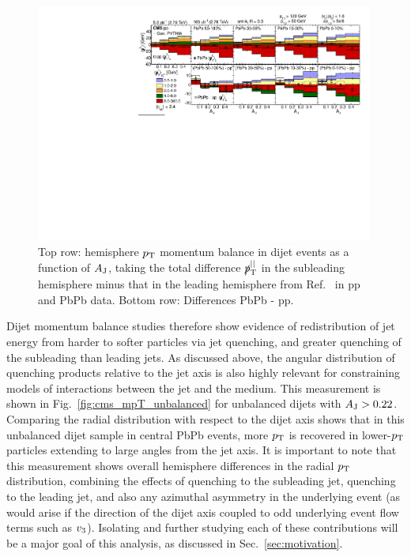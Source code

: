 \begin{figure}[hbtp]
\begin{center}
\includegraphics[width=0.99\textwidth]{figures/Theory/CMS_mpT.pdf}
\caption[Hemisphere momentum balance in dijet events as a function of $A_{\rm J}$]{Top row: hemisphere $p_{\rm T}$ momentum balance in dijet events as a function of $A_{\rm J}$, taking the total difference $\slashed{p}_{\rm T}^{\rm ||}$ in the subleading hemisphere minus that in the leading hemisphere from Ref.~\cite{HIN_2014_010} in pp and PbPb data.  Bottom row:  Differences PbPb - pp.}
\label{fig:cms_mpT}
\end{center}
\end{figure}

Dijet momentum balance studies therefore show evidence of redistribution of jet energy from harder to softer particles via jet quenching, and greater quenching of the subleading than leading jets.  As discussed above, the angular distribution of quenching products relative to the jet axis is also highly relevant for constraining models of interactions between the jet and the medium.  This measurement is shown in Fig.~\ref{fig:cms_mpT_unbalanced} for unbalanced dijets with $A_{\rm J} > 0.22$.  Comparing the radial distribution with respect to the dijet axis shows that in this unbalanced dijet sample in central PbPb events, more $p_{\rm T}$ is recovered in lower-$p_{\rm T}$ particles extending to large angles from the jet axis.  It is important to note that this measurement shows overall hemisphere differences in the radial $p_{\rm T}$ distribution, combining the effects of quenching to the subleading jet, quenching to the leading jet, and also any azimuthal asymmetry in the underlying event (as would arise if the direction of the dijet axis coupled to odd underlying event flow terms such as $v_{\rm 3}$).  Isolating and further studying each of these contributions will be a major goal of this analysis, as discussed in Sec.~\ref{sec:motivation}.


